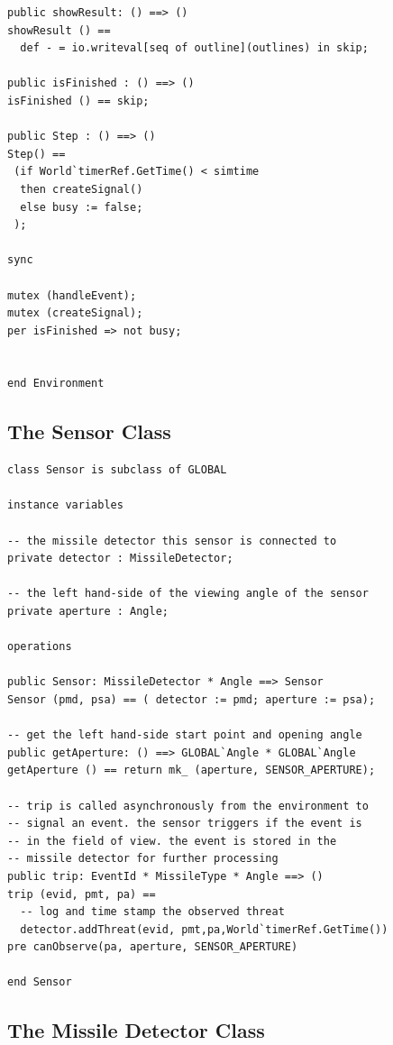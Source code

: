 \documentclass{overturerepchap}
\begin{document}
\begin{lstlisting}
public showResult: () ==> ()
showResult () ==
  def - = io.writeval[seq of outline](outlines) in skip;

public isFinished : () ==> ()
isFinished () == skip;

public Step : () ==> ()
Step() ==
 (if World`timerRef.GetTime() < simtime
  then createSignal()
  else busy := false;
 );
 
sync

mutex (handleEvent);
mutex (createSignal);
per isFinished => not busy;


end Environment
\end{lstlisting}

\subsection{The Sensor Class}

\begin{lstlisting}
class Sensor is subclass of GLOBAL

instance variables

-- the missile detector this sensor is connected to
private detector : MissileDetector;

-- the left hand-side of the viewing angle of the sensor
private aperture : Angle;

operations

public Sensor: MissileDetector * Angle ==> Sensor
Sensor (pmd, psa) == ( detector := pmd; aperture := psa);

-- get the left hand-side start point and opening angle
public getAperture: () ==> GLOBAL`Angle * GLOBAL`Angle
getAperture () == return mk_ (aperture, SENSOR_APERTURE);

-- trip is called asynchronously from the environment to
-- signal an event. the sensor triggers if the event is
-- in the field of view. the event is stored in the
-- missile detector for further processing
public trip: EventId * MissileType * Angle ==> ()
trip (evid, pmt, pa) ==
  -- log and time stamp the observed threat
  detector.addThreat(evid, pmt,pa,World`timerRef.GetTime())
pre canObserve(pa, aperture, SENSOR_APERTURE)

end Sensor
\end{lstlisting}

\subsection{The Missile Detector Class}
\end{document}

